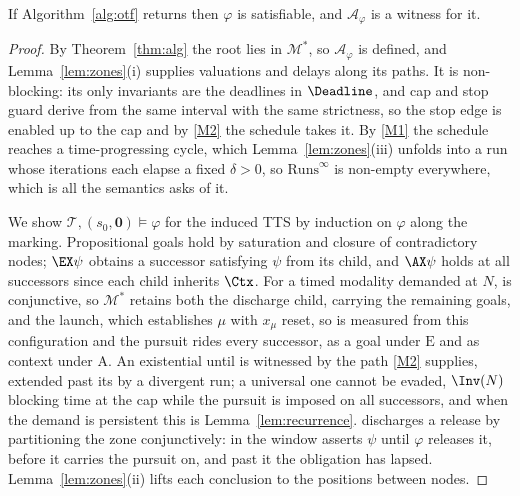 \begin{theorem}[Soundness]\label{thm:soundness}
If Algorithm~\ref{alg:otf} returns \SAT{} then $\varphi$ is satisfiable, and $\mathcal A_\varphi$ is
a witness for it.
\end{theorem}
\begin{proof}
By Theorem~\ref{thm:alg} the root lies in $\mathcal M^{*}$, so $\mathcal A_\varphi$ is defined, and
Lemma~\ref{lem:zones}(i) supplies valuations and delays along its paths. It is non-blocking: its only
invariants are the deadlines in $\Deadline$, and cap and stop guard derive from the same interval with the
same strictness, so the stop edge is enabled up to the cap and by \ref{M2} the schedule takes it. By
\ref{M1} the schedule reaches a time-progressing cycle, which Lemma~\ref{lem:zones}(iii) unfolds into
a run whose iterations each elapse a fixed $\delta>0$, so $\mathrm{Runs}^\infty$ is non-empty
everywhere, which is all the semantics asks of it.

We show $\mathcal T,(s_0,\mathbf 0)\models\varphi$ for the induced TTS by induction on $\varphi$
along the marking. Propositional goals hold by saturation and closure of contradictory nodes;
$\EX\psi$ obtains a successor satisfying $\psi$ from its  child, and $\AX\psi$ holds at
all successors since each child inherits $\Ctx$. For a timed modality demanded at $N$,
 is conjunctive, so $\mathcal M^{*}$ retains both the discharge child, carrying the
remaining goals, and the launch, which establishes $\mu$ with $x_\mu$ reset, so \kI is measured from
this configuration and the pursuit rides every successor, as a goal under $\mathrm{E}$ and as context
under $\mathrm{A}$. An existential until is witnessed by the path \ref{M2} supplies, extended past
its  by a divergent run; a universal one cannot be evaded, $\Inv(N)$ blocking time at
the cap while the pursuit is imposed on all successors, and when the demand is persistent this is
Lemma~\ref{lem:recurrence}.  discharges a release by partitioning the zone
conjunctively: in the window  asserts $\psi$ until $\varphi$ releases it, before it
 carries the pursuit on, and past it the obligation has lapsed.
Lemma~\ref{lem:zones}(ii) lifts each conclusion to the positions between nodes.
\end{proof}


